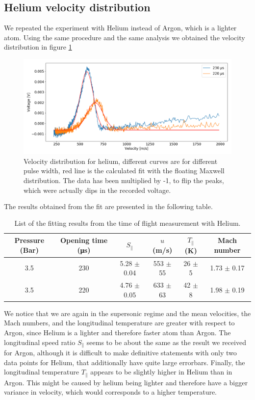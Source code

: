\documentclass[a4paper,10pt]{article}
\begin{document}
\subsection{Helium velocity distribution}
We repeated the experiment with Helium instead of Argon, which is a lighter atom. Using the same procedure and the same analysis we obtained the velocity distribution in figure \ref{heliumtof}
\begin{figure}[H]
\centering
\includegraphics[width= \textwidth]{heliumtof}
\caption{Velocity distribution for helium, different curves are for different pulse width, red line is the calculated fit with the floating Maxwell distribution. The data has been multiplied by -1, to flip the peaks, which were actually dips in the recorded voltage.}\label{heliumtof}
\end{figure}\newpage
The results obtained from the fit are presented in the following table. 
\begin{table}[H]
\begin{center}
\begin{tabular}{cccccc} \toprule
Pressure (Bar) & Opening time (\si{\micro \s}) & $S_\parallel$ & $u$ (m/s) & $T_\parallel$ (K) & Mach number \\ \midrule
3.5 & 230 & 5.28 $\pm$ 0.04 & 553 $\pm$ 55 & 26 $\pm$ 5 & 1.73 $\pm$ 0.17 \\
3.5 & 220 & 4.76 $\pm$ 0.05 & 633 $\pm$ 63 & 42 $\pm$ 8 & 1.98 $\pm$ 0.19 \\\bottomrule
\end{tabular}
\caption{List of the fitting results from the time of flight measurement with Helium.}
\end{center}
\end{table}
We notice that we are again in the supersonic regime and the mean velocities, the Mach numbers, and the longitudinal temperature are greater with respect to Argon, since Helium is a lighter and therefore faster atom than Argon. 
The longitudinal speed ratio $S_\parallel$ seems to be about the same as the result we received for Argon, although it is difficult to make definitive statements with only two data points for Helium, that additionally have quite large errorbars. 
Finally, the longitudinal temperature $T_\parallel$ appears to be slightly higher in Helium than in Argon. This might be caused by helium being lighter and therefore have a bigger variance in velocity, which would corresponds to a higher temperature. 
\end{document}
